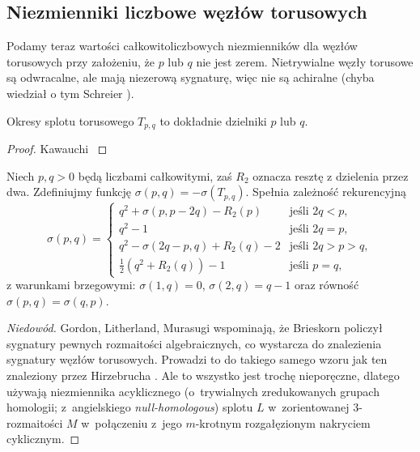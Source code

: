
\subsection{Niezmienniki liczbowe węzłów torusowych}
Podamy teraz wartości całkowitoliczbowych niezmienników dla węzłów torusowych przy założeniu, że $p$ lub $q$ nie jest zerem.
Nietrywialne węzły torusowe są odwracalne, ale mają niezerową sygnaturę, więc nie są achiralne (chyba wiedział o tym Schreier \cite{schreier1924}).

\begin{proposition}
%
    Okresy splotu torusowego $T_{p, q}$ to dokładnie dzielniki $p$ lub $q$.
\end{proposition}

\begin{proof}
    Kawauchi \cite[ćw 10.1.9]{kawauchi1996}
\end{proof}

\begin{proposition}
%
    Niech $p, q > 0$ będą liczbami całkowitymi, zaś $R_2$ oznacza resztę z dzielenia przez dwa.
    Zdefiniujmy funkcję $\sigma(p, q) = - \sigma(T_{p, q})$.
    Spełnia zależność rekurencyjną
    \begin{equation}
        \sigma(p, q) = \begin{cases}
             q^2 + \sigma(p, p - 2q) - R_2(p)       & \text{jeśli } 2q < p, \\
             q^2 - 1                              & \text{jeśli } 2q = p, \\
             q^2 - \sigma(2q - p, q) + R_2(q) - 2 & \text{jeśli } 2q > p > q, \\
             \frac 12 (q^2 + R_2(q)) - 1                 & \text{jeśli } p = q,
        \end{cases}
    \end{equation}
    z warunkami brzegowymi: $\sigma(1, q) = 0$, $\sigma(2, q) = q-1$ oraz równość $\sigma(p, q) = \sigma(q, p)$.
\end{proposition}

\begin{proof}[Niedowód]
%
%
%
%
%
    Gordon, Litherland, Murasugi \cite[tw. 5.2]{litherland1981} wspominają, że Brieskorn \cite{brieskorn1966} policzył sygnatury pewnych rozmaitości algebraicznych, co wystarcza do znalezienia sygnatury węzłów torusowych.
    Prowadzi to do takiego samego wzoru jak ten znaleziony przez Hirzebrucha \cite{hirzebruch1968}.
    Ale to wszystko jest trochę nieporęczne, dlatego używają niezmiennika acyklicznego (o~trywialnych zredukowanych grupach homologii; z~angielskiego \emph{null-homologous}) splotu $L$ w~zorientowanej 3-rozmaitości $M$ w~połączeniu z~jego $m$-krotnym rozgałęzionym nakryciem cyklicznym.
%
\end{proof}

